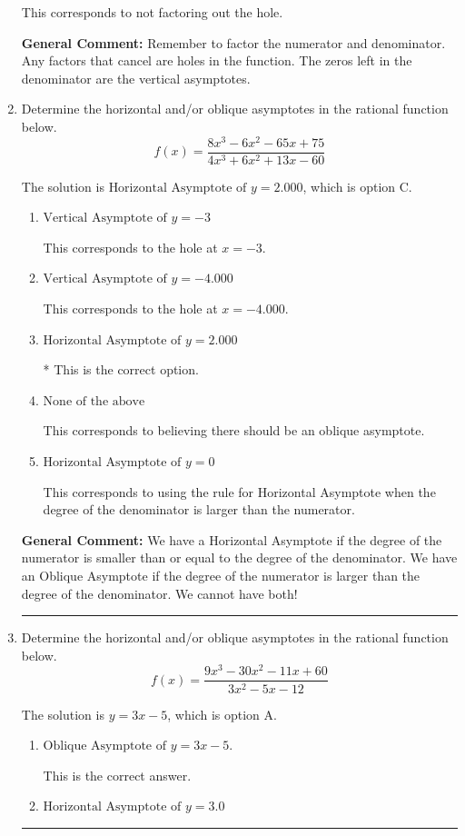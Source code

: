 \documentclass{extbook}[14pt]
\newcommand{\litem}[1]{\item #1

\rule{\textwidth}{0.4pt}}
\begin{document}
\begin{enumerate}
{\begin{enumerate}[label=\Alph*.]
This corresponds to not factoring out the hole.
\end{enumerate}

\textbf{General Comment:} Remember to factor the numerator and denominator. Any factors that cancel are holes in the function. The zeros left in the denominator are the vertical asymptotes.
}
\litem{
Determine the horizontal and/or oblique asymptotes in the rational function below.
\[ f(x) = \frac{8x^{3} -6 x^{2} -65 x + 75}{4x^{3} +6 x^{2} +13 x -60} \]

The solution is \( \text{Horizontal Asymptote of } y = 2.000  \), which is option C.\begin{enumerate}[label=\Alph*.]
\item \( \text{Vertical Asymptote of } y = -3  \)

This corresponds to the hole at $x = -3$.
\item \( \text{Vertical Asymptote of } y = -4.000  \)

This corresponds to the hole at $x = -4.000$.
\item \( \text{Horizontal Asymptote of } y = 2.000  \)

* This is the correct option.
\item \( \text{None of the above} \)

This corresponds to believing there should be an oblique asymptote.
\item \( \text{Horizontal Asymptote of } y = 0  \)

This corresponds to using the rule for Horizontal Asymptote when the degree of the denominator is larger than the numerator.
\end{enumerate}

\textbf{General Comment:} We have a Horizontal Asymptote if the degree of the numerator is smaller than or equal to the degree of the denominator. We have an Oblique Asymptote if the degree of the numerator is larger than the degree of the denominator. We cannot have both!
}
\litem{
Determine the horizontal and/or oblique asymptotes in the rational function below.
\[ f(x) = \frac{9x^{3} -30 x^{2} -11 x + 60}{3x^{2} -5 x -12} \]

The solution is \( y = 3x -5 \), which is option A.\begin{enumerate}[label=\Alph*.]
\item \( \text{Oblique Asymptote of } y = 3x -5. \)

This is the correct answer.
\item \( \text{Horizontal Asymptote of } y = 3.0  \)


\end{enumerate}}
\end{enumerate}
\end{document}
